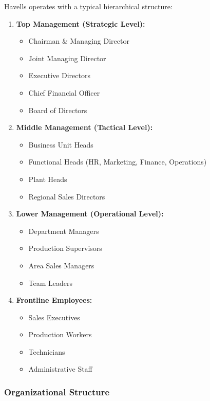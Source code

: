 \documentclass[12pt,a4paper]{article}
\begin{document}
Havells operates with a typical hierarchical structure:

\begin{enumerate}[leftmargin=*]
    \item \textbf{Top Management (Strategic Level):}
    \begin{itemize}
        \item Chairman \& Managing Director
        \item Joint Managing Director
        \item Executive Directors
        \item Chief Financial Officer
        \item Board of Directors
    \end{itemize}
    
    \item \textbf{Middle Management (Tactical Level):}
    \begin{itemize}
        \item Business Unit Heads
        \item Functional Heads (HR, Marketing, Finance, Operations)
        \item Plant Heads
        \item Regional Sales Directors
    \end{itemize}
    
    \item \textbf{Lower Management (Operational Level):}
    \begin{itemize}
        \item Department Managers
        \item Production Supervisors
        \item Area Sales Managers
        \item Team Leaders
    \end{itemize}
    
    \item \textbf{Frontline Employees:}
    \begin{itemize}
        \item Sales Executives
        \item Production Workers
        \item Technicians
        \item Administrative Staff
    \end{itemize}
\end{enumerate}

\subsubsection{Organizational Structure}
\end{document}
